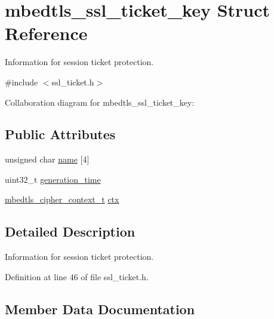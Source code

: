 \hypertarget{structmbedtls__ssl__ticket__key}{}\section{mbedtls\+\_\+ssl\+\_\+ticket\+\_\+key Struct Reference}
\label{structmbedtls__ssl__ticket__key}


Information for session ticket protection.  




{\ttfamily \#include $<$ssl\+\_\+ticket.\+h$>$}



Collaboration diagram for mbedtls\+\_\+ssl\+\_\+ticket\+\_\+key\+:
\subsection*{Public Attributes}
\begin{DoxyCompactItemize}
\item 
unsigned char \mbox{\hyperlink{structmbedtls__ssl__ticket__key_a5c80ec11a07ab4e19e775f7586a11d21}{name}} \mbox{[}4\mbox{]}
\item 
uint32\+\_\+t \mbox{\hyperlink{structmbedtls__ssl__ticket__key_ada9d97d06d4c215e4810880427ca50ad}{generation\+\_\+time}}
\item 
\mbox{\hyperlink{structmbedtls__cipher__context__t}{mbedtls\+\_\+cipher\+\_\+context\+\_\+t}} \mbox{\hyperlink{structmbedtls__ssl__ticket__key_ad347a5aa480ee9df7f32c16d1bd56aae}{ctx}}
\end{DoxyCompactItemize}


\subsection{Detailed Description}
Information for session ticket protection. 

Definition at line 46 of file ssl\+\_\+ticket.\+h.



\subsection{Member Data Documentation}
\mbox{\label{structmbedtls__ssl__ticket__key_ad347a5aa480ee9df7f32c16d1bd56aae}} 
